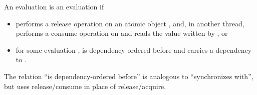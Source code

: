 \pnum
An evaluation  is  an evaluation
 if
\begin{itemize}
\item
{} performs a release operation on an atomic object , and, in
another thread,  performs a consume operation on  and reads
the value written by , or

\item
for some evaluation ,  is dependency-ordered before  and
 carries a dependency to .

\end{itemize}
\begin{note}
The relation ``is dependency-ordered before'' is analogous to
``synchronizes with'', but uses release/consume in place of release/acquire.
\end{note}

